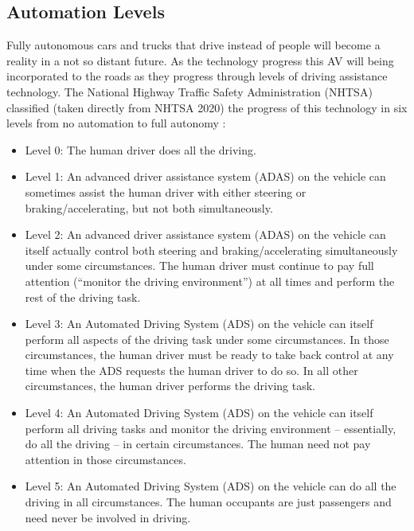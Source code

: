     \subsection{Automation Levels}
    Fully autonomous cars and trucks that drive instead of people will become a reality in a not so distant future. As the technology progress this AV will being incorporated to the roads as they progress through levels of driving assistance technology. The National Highway Traffic Safety Administration (NHTSA) classified (taken directly from NHTSA 2020) the progress of this technology in six levels from no automation to full autonomy \cite{nhtsa}:
    \begin{itemize}
        \item Level 0: The human driver does all the driving.
        \item Level 1: An advanced driver assistance system (ADAS) on the vehicle can sometimes assist the human driver with either steering or braking/accelerating, but not both simultaneously.
        \item Level 2: An advanced driver assistance system (ADAS) on the vehicle can itself actually control both steering and braking/accelerating simultaneously under some circumstances.  The human driver must continue to pay full attention (“monitor the driving environment”) at all times and perform the rest of the driving task.
        \item Level 3: 	An Automated Driving System (ADS) on the vehicle can itself perform all aspects of the driving task under some circumstances.  In those circumstances, the human driver must be ready to take back control at any time when the ADS requests the human driver to do so.  In all other circumstances, the human driver performs the driving task.
        \item Level 4: 	An Automated Driving System (ADS) on the vehicle can itself perform all driving tasks and monitor the driving environment – essentially, do all the driving – in certain circumstances.  The human need not pay attention in those circumstances.
        \item Level 5: 	An Automated Driving System (ADS) on the vehicle can do all the driving in all circumstances.  The human occupants are just passengers and need never be involved in driving.
    \end{itemize}
    
